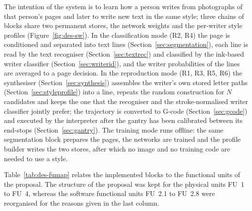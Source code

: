 The intention of the system is to learn how a person writes from photographs of that person's pages and later to write new text in the same style; three chains of blocks share two permanent stores, the network weights and the per-writer style profiles (Figure~\ref{fig:des-sw}).
In the classification mode (R2, R4) the page is conditioned and separated into text lines (Section~\ref{sec:segmentation}), each line is read by the text recogniser (Section~\ref{sec:textrec}) and classified by the ink-based writer classifier (Section~\ref{sec:writerid}), and the writer probabilities of the lines are averaged to a page decision.
In the reproduction mode (R1, R3, R5, R6) the synthesiser (Section~\ref{sec:synthesis}) assembles the writer's own stored letter paths (Section~\ref{sec:styleprofile}) into a line, repeats the random construction for $N$ candidates and keeps the one that the recogniser and the stroke-normalised writer classifier jointly prefer; the trajectory is converted to G-code (Section~\ref{sec:gcode}) and executed by the interpreter after the gantry has been calibrated between its end-stops (Section~\ref{sec:gantry}).
The training mode runs offline: the same segmentation block prepares the pages, the networks are trained and the profile builder writes the two stores, after which no image and no training code are needed to use a style.

Table~\ref{tab:des-fumap} relates the implemented blocks to the functional units of the proposal.
The structure of the proposal was kept for the physical units FU~1 to FU~4, whereas the software functional units FU~2.1 to FU~2.8 were reorganised for the reasons given in the last column.

